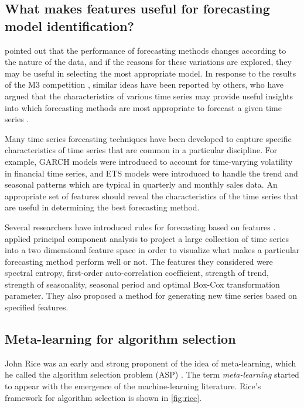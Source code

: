 \documentclass[11pt,a4paper,]{article}
\theoremstyle{definition}
\theoremstyle{definition}
\theoremstyle{definition}
\theoremstyle{remark}
\begin{document}
\subsection{What makes features useful for forecasting model
identification?}\label{what-makes-features-useful-for-forecasting-model-identification}

\textcite{reid1972comparison} pointed out that the performance of
forecasting methods changes according to the nature of the data, and if
the reasons for these variations are explored, they may be useful in
selecting the most appropriate model. In response to the results of the
M3 competition \autocite{makridakis2000m3}, similar ideas have been
reported by others, who have argued that the characteristics of various
time series may provide useful insights into which forecasting methods
are most appropriate to forecast a given time series
\autocites{hyndman2001s}{lawrence2001s}{armstrong2001s}.

Many time series forecasting techniques have been developed to capture
specific characteristics of time series that are common in a particular
discipline. For example, GARCH models were introduced to account for
time-varying volatility in financial time series, and ETS models were
introduced to handle the trend and seasonal patterns which are typical
in quarterly and monthly sales data. An appropriate set of features
should reveal the characteristics of the time series that are useful in
determining the best forecasting method.

Several researchers have introduced rules for forecasting based on
features \autocites{collopy1992rule}{adya2001automatic}{wang2009rule}.
\textcite{kang2017visualising} applied principal component analysis to
project a large collection of time series into a two dimensional feature
space in order to visualize what makes a particular forecasting method
perform well or not. The features they considered were spectral entropy,
first-order auto-correlation coefficient, strength of trend, strength of
seasonality, seasonal period and optimal Box-Cox transformation
parameter. They also proposed a method for generating new time series
based on specified features.

\subsection{Meta-learning for algorithm
selection}\label{meta-learning-for-algorithm-selection}

John Rice was an early and strong proponent of the idea of
meta-learning, which he called the algorithm selection problem (ASP)
\autocite{rice1976}. The term \emph{meta-learning} started to appear
with the emergence of the machine-learning literature. Rice's framework
for algorithm selection is shown in \autoref{fig:rice}.
\end{document}
